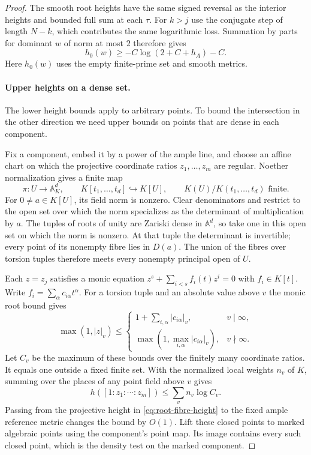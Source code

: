 \begin{proof}
The smooth root heights have the same signed reversal as the
interior heights and bounded full sum at each \(\tau\). For
\(k>j\) use the conjugate step of length \(N-k\), which contributes
the same logarithmic loss. Summation by parts for dominant \(w\)
of norm at most \(2\) therefore gives
\[
 h_0(w)\ge -C\log(2+C+h_A)-C .
\]
Here \(h_0(w)\) uses the empty finite-prime set and smooth metrics.
\label{cor:flag-point-heights-6}

\paragraph{Upper heights on a dense set.}

The lower height bounds apply to arbitrary points. To bound the intersection in the other direction we need upper bounds on points that are dense in each component.

Fix a component, embed it by a power of the ample line, and
choose an affine chart on which the projective coordinate ratios
\(z_1,\ldots,z_m\) are regular. Noether normalization gives a
finite map
\[
 \pi\colon U\longrightarrow\mathbb A^d_K,\qquad
 K[t_1,\ldots,t_d]\hookrightarrow K[U],\qquad
 K(U)/K(t_1,\ldots,t_d)\text{ finite}.
\]
For \(0\ne a\in K[U]\), its field norm is nonzero.
Clear denominators and restrict to the open set over which the
norm specializes as the determinant of multiplication by \(a\).
The tuples of roots of unity are Zariski dense in \(\mathbb A^d\),
so take one in this open set on which the norm is nonzero. At that
tuple the determinant is invertible; every point of its nonempty
fibre lies in \(D(a)\). The union of the fibres over torsion tuples
therefore meets every nonempty principal open of \(U\).

Each \(z=z_j\) satisfies a monic equation
\(z^s+\sum_{i<s}f_i(t)z^i=0\) with \(f_i\in K[t]\).
Write \(f_i=\sum_\alpha c_{i\alpha}t^\alpha\). For a torsion tuple
and an absolute value above \(v\) the monic root bound gives
\[
 \max(1,|z|_v)\le
 \begin{cases}
  1+\sum_{i,\alpha}|c_{i\alpha}|_v,& v\mid\infty,\\
  \max(1,\max_{i,\alpha}|c_{i\alpha}|_v),& v\nmid\infty .
 \end{cases}
\]
Let \(C_v\) be the maximum of these bounds over the finitely
many coordinate ratios. It equals one outside a fixed finite
set. With the normalized local weights \(n_v\) of \(K\), summing
over the places of any point field above \(v\) gives
\begin{equation}\label{eq:root-fibre-height}
       h([1:z_1:\cdots:z_m])\le\sum_v n_v\log C_v.
\end{equation}
Passing from the projective height in \eqref{eq:root-fibre-height}
to the fixed ample reference metric changes the bound by \(O(1)\).
Lift these closed points to marked algebraic points using the
component's point map. Its image contains every such closed point,
which is the density test on the marked component.


\end{proof}
